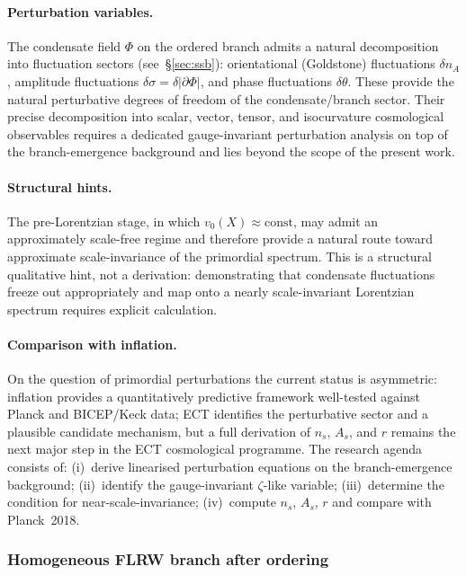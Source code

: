 \documentclass[11pt,a4paper]{article}
\numberwithin{equation}{section}
\begin{document}
\paragraph{Perturbation variables.}
The condensate field $\Phi$ on the ordered branch admits a natural
decomposition into fluctuation sectors
(see~\S\ref{sec:ssb}):
orientational (Goldstone) fluctuations $\delta n_A$,
amplitude fluctuations $\delta\sigma = \delta|\partial\Phi|$,
and phase fluctuations $\delta\theta$.
These provide the natural perturbative degrees of freedom of the
condensate/branch sector.
Their precise decomposition into scalar, vector, tensor, and
isocurvature cosmological observables requires a dedicated
gauge-invariant perturbation analysis on top of the branch-emergence
background and lies beyond the scope of the present work.

\paragraph{Structural hints.}
The pre-Lorentzian stage, in which $v_0(X)\approx\mathrm{const}$, may
admit an approximately scale-free regime and therefore provide a
natural route toward approximate scale-invariance of the primordial
spectrum.
This is a structural qualitative hint, not a derivation: demonstrating
that condensate fluctuations freeze out appropriately and map onto a
nearly scale-invariant Lorentzian spectrum requires explicit
calculation.

\paragraph{Comparison with inflation.}
On the question of primordial perturbations the current status is
asymmetric: inflation provides a quantitatively predictive framework
well-tested against Planck and BICEP/Keck data; ECT identifies the
perturbative sector and a plausible candidate mechanism, but a full
derivation of $n_s$, $A_s$, and $r$ remains the next major step in
the ECT cosmological programme.
The research agenda consists of:
(i)~derive linearised perturbation equations on the branch-emergence
background;
(ii)~identify the gauge-invariant $\zeta$-like variable;
(iii)~determine the condition for near-scale-invariance;
(iv)~compute $n_s$, $A_s$, $r$ and compare with Planck~2018.


\subsubsection*{Homogeneous FLRW branch after ordering}
\end{document}
